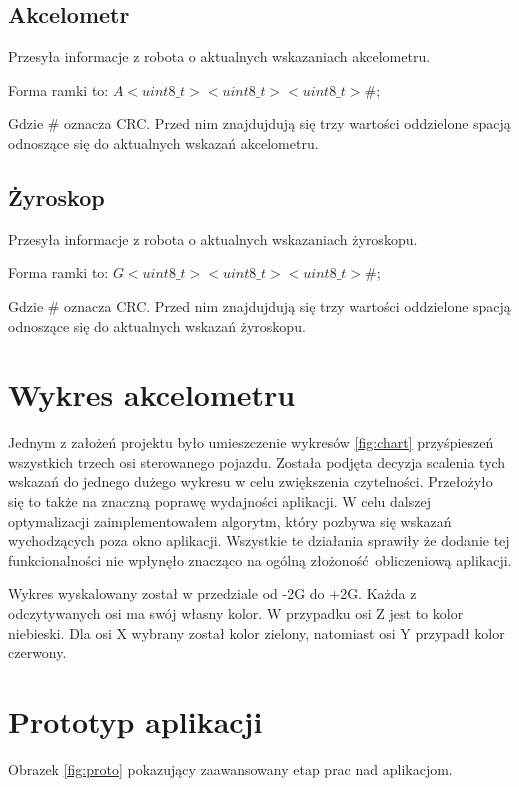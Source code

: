 \documentclass[12pt,a4paper,polish]{article}
\begin{document}
  \subsection{Akcelometr}
  Przesyła informacje z robota o aktualnych wskazaniach akcelometru.

  Forma ramki to: $A<uint8\_t> <uint8\_t> <uint8\_t>\#$;
  \newline

  Gdzie \# oznacza CRC. Przed nim znajdujdują się trzy wartości oddzielone spacją
  odnoszące się do aktualnych wskazań akcelometru.


  \subsection{Żyroskop}
  Przesyła informacje z robota o aktualnych wskazaniach żyroskopu.

  Forma ramki to: $G<uint8\_t> <uint8\_t> <uint8\_t>\#$;
  \newline

  Gdzie \# oznacza CRC. Przed nim znajdujdują się trzy wartości oddzielone spacją
  odnoszące się do aktualnych wskazań żyroskopu.

  \section{Wykres akcelometru}
  Jednym z założeń projektu było umieszczenie wykresów \ref{fig:chart} przyśpieszeń wszystkich
  trzech osi sterowanego pojazdu. Została podjęta decyzja scalenia tych wskazań
  do jednego dużego wykresu w celu zwiększenia czytelności. Przełożyło się to także
  na znaczną poprawę wydajności aplikacji. W celu dalszej optymalizacji 
  zaimplementowałem algorytm, który pozbywa się wskazań wychodzących poza okno 
  aplikacji. Wszystkie te działania sprawiły że dodanie tej funkcionalności
  nie wpłynęło znacząco na ogólną złożoność obliczeniową aplikacji.
  
  Wykres wyskalowany został w przedziale od -2G do +2G. Każda z odczytywanych osi
  ma swój własny kolor. W przypadku osi Z jest to kolor niebieski. 
  Dla osi X wybrany został kolor zielony, natomiast osi Y przypadł kolor czerwony.

  \section{Prototyp aplikacji}
  Obrazek \ref{fig:proto} pokazujący zaawansowany etap prac nad aplikacjom.
\end{document}
